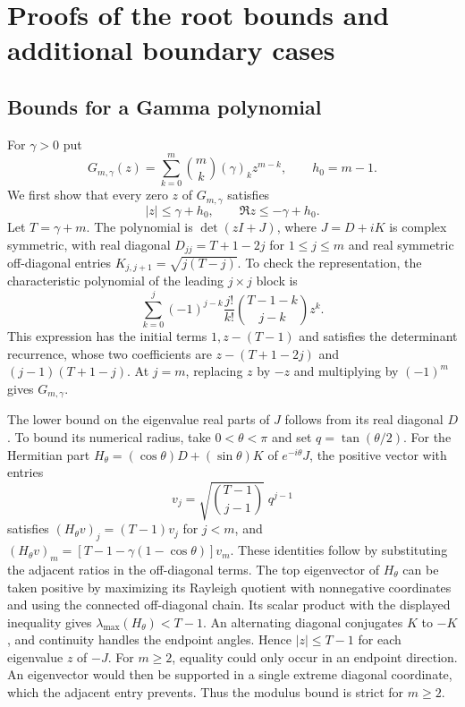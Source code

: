 \section{Proofs of the root bounds and additional boundary cases}
\label{sec:gamma-annulus-proof}

\subsection{Bounds for a Gamma polynomial}

For \(\gamma>0\) put
\[
 G_{m,\gamma}(z)=\sum_{k=0}^m\binom{m}{k}(\gamma)_kz^{m-k},
 \qquad h_0=m-1 .
\]
We first show that every zero \(z\) of \(G_{m,\gamma}\) satisfies
\[
 |z|\le\gamma+h_0,\qquad
 \Re z\le-\gamma+h_0.
\]
Let \(T=\gamma+m\). The polynomial is \(\det(zI+J)\), where
\(J=D+iK\) is complex symmetric, with real diagonal
\(D_{jj}=T+1-2j\) for \(1\le j\le m\) and real symmetric
off-diagonal entries \(K_{j,j+1}=\sqrt{j(T-j)}\).
To check the representation, the characteristic polynomial of the
leading \(j\times j\) block is
\[
 \sum_{k=0}^j(-1)^{j-k}\frac{j!}{k!}\binom{T-1-k}{j-k}z^k .
\]
This expression has the initial terms \(1,z-(T-1)\) and
satisfies the determinant recurrence, whose two coefficients are
\(z-(T+1-2j)\) and \((j-1)(T+1-j)\). At \(j=m\), replacing \(z\)
by \(-z\) and multiplying by \((-1)^m\) gives \(G_{m,\gamma}\).

The lower bound on the eigenvalue real parts of \(J\) follows
from its real diagonal \(D\). To bound its numerical radius,
take \(0<\theta<\pi\) and set \(q=\tan(\theta/2)\).
For the Hermitian part \(H_\theta=(\cos\theta)D+(\sin\theta)K\) of
\(e^{-i\theta}J\), the positive vector with entries
\[
 v_j=\sqrt{\binom{T-1}{j-1}}\;q^{j-1}
\]
satisfies \((H_\theta v)_j=(T-1)v_j\) for \(j<m\), and
\((H_\theta v)_m=[T-1-\gamma(1-\cos\theta)]v_m\).
These identities follow by substituting the adjacent ratios
in the off-diagonal terms. The top eigenvector of \(H_\theta\)
can be taken positive by maximizing its Rayleigh quotient
with nonnegative coordinates and using the connected off-diagonal
chain. Its scalar product with the displayed inequality gives
\(\lambda_{\max}(H_\theta)<T-1\). An alternating diagonal
conjugates \(K\) to \(-K\), and continuity handles the endpoint
angles. Hence \(|z|\le T-1\) for each eigenvalue \(z\) of
\(-J\). For \(m\ge2\), equality could only occur in an endpoint
direction. An eigenvector would then be supported in a single
extreme diagonal coordinate, which the adjacent entry prevents.
Thus the modulus bound is strict for \(m\ge2\).

